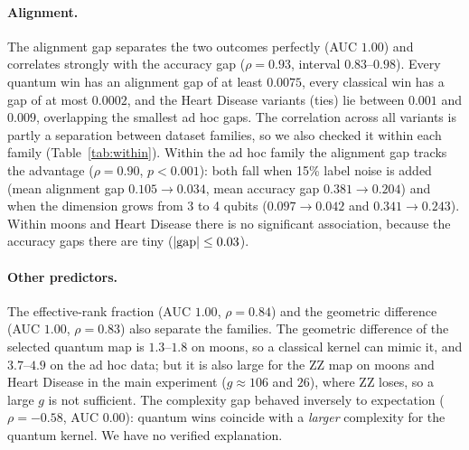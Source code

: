 \documentclass[11pt,a4paper]{article}
\begin{document}
\paragraph{Alignment.} The alignment gap separates the two outcomes perfectly (AUC $1.00$) and correlates strongly with the accuracy gap ($\rho=0.93$, interval $0.83$--$0.98$). Every quantum win has an alignment gap of at least $0.0075$, every classical win has a gap of at most $0.0002$, and the Heart Disease variants (ties) lie between $0.001$ and $0.009$, overlapping the smallest ad hoc gaps. The correlation across all variants is partly a separation between dataset families, so we also checked it within each family (Table~\ref{tab:within}). Within the ad hoc family the alignment gap tracks the advantage ($\rho=0.90$, $p<0.001$): both fall when 15\% label noise is added (mean alignment gap $0.105\to0.034$, mean accuracy gap $0.381\to0.204$) and when the dimension grows from 3 to 4 qubits ($0.097\to0.042$ and $0.341\to0.243$). Within moons and Heart Disease there is no significant association, because the accuracy gaps there are tiny ($|{\rm gap}|\le0.03$).
\begin{table}[h]\centering\small

\caption{Alignment gap against accuracy gap within each dataset family.}
\label{tab:within}
\end{table}

\paragraph{Other predictors.} The effective-rank fraction (AUC $1.00$, $\rho=0.84$) and the geometric difference (AUC $1.00$, $\rho=0.83$) also separate the families. The geometric difference of the selected quantum map is $1.3$--$1.8$ on moons, so a classical kernel can mimic it, and $3.7$--$4.9$ on the ad hoc data; but it is also large for the ZZ map on moons and Heart Disease in the main experiment ($g\approx106$ and $26$), where ZZ loses, so a large $g$ is not sufficient. The complexity gap behaved inversely to expectation ($\rho=-0.58$, AUC $0.00$): quantum wins coincide with a \emph{larger} complexity for the quantum kernel. We have no verified explanation.
\end{document}
